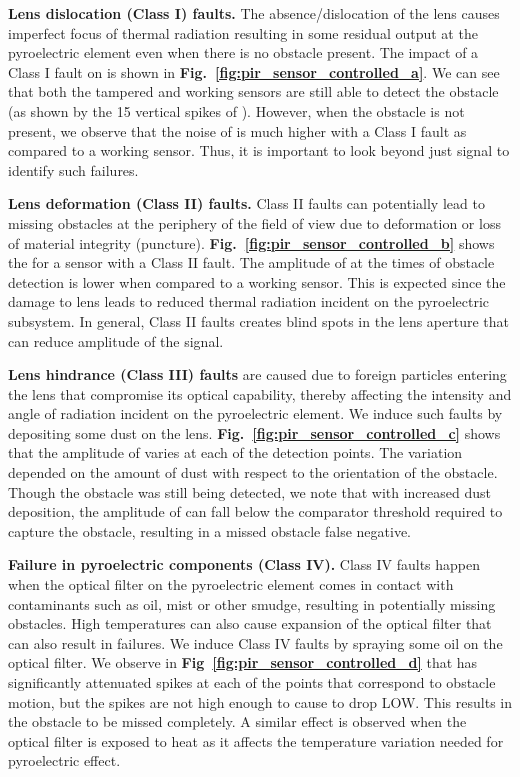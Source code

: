 \textbf{Lens dislocation (Class I) faults.} The absence/dislocation of the lens causes imperfect focus of thermal radiation resulting in some residual output at the pyroelectric element even when there is no obstacle present. The impact of a Class I fault on \aout is shown in \textbf{Fig.~\ref{fig:pir_sensor_controlled_a}}. 
We can see that both the tampered and working sensors are still able to detect the obstacle (as shown by the 15 vertical spikes of \aout). However, when the obstacle is not present, we observe that the noise of \aout is much higher with a Class I fault as compared to a working sensor. Thus, it is important to look beyond just \cout signal to identify such failures.

\textbf{Lens deformation (Class II) faults.} Class II faults can potentially lead to missing obstacles at the periphery of the field of view due to deformation or loss of material integrity (\eg puncture). 
\textbf{Fig.~\ref{fig:pir_sensor_controlled_b}} shows the \aout for a sensor with a Class II fault. The amplitude of \aout at the times of obstacle detection is lower when compared to a working sensor. This is expected since the damage to lens leads to reduced thermal radiation incident on the pyroelectric subsystem. In general, Class II faults creates blind spots in the lens aperture that can reduce amplitude of the \aout signal. 


\textbf{Lens hindrance (Class III) faults} are caused due to foreign particles entering the lens that compromise its optical capability, thereby affecting the intensity and angle of radiation incident on the pyroelectric element. 
We induce such faults by depositing some dust on the lens.
\textbf{Fig.~\ref{fig:pir_sensor_controlled_c}} shows that the amplitude of \aout varies at each of the detection points. The variation depended on the amount of dust with respect to the orientation of the obstacle. Though the obstacle was still being detected, we note that with increased dust deposition, the amplitude of \aout can fall below the comparator threshold required to capture the obstacle, resulting in a missed obstacle \ie false negative. 




\textbf{Failure in pyroelectric components (Class IV).} Class IV faults happen when the optical filter on the pyroelectric element comes in contact with contaminants such as oil, mist or other smudge, resulting in potentially missing obstacles. High temperatures can also cause expansion of the optical filter that can also result in failures. 
We induce Class IV faults by spraying some oil on the optical filter. We observe in {\bfseries Fig~\ref{fig:pir_sensor_controlled_d}} that \aout has significantly attenuated spikes at each of the points that correspond to obstacle motion, but the spikes are not high enough to cause \cout to drop LOW. This results in the obstacle to be missed completely. A similar effect is observed when the optical filter is exposed to heat as it affects the temperature variation needed for pyroelectric effect.


